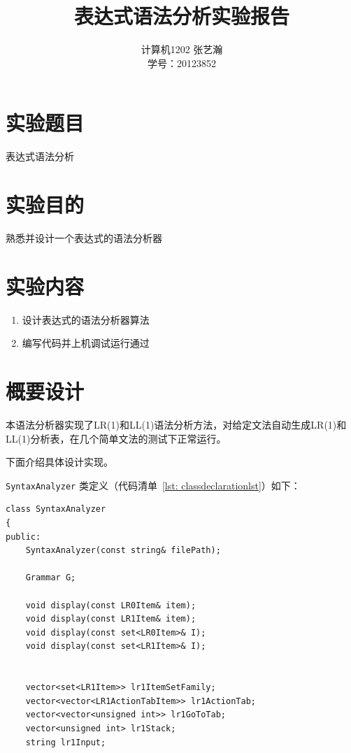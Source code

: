 \documentclass{article}
\begin{document}
\begin{CJK*}{UTF8}{gbsn}
\CJKtilde

\title{表达式语法分析实验报告}

\author{计算机1202 张艺瀚\\学号：20123852}
\maketitle

\section{实验题目}
表达式语法分析

\section{实验目的}
熟悉并设计一个表达式的语法分析器

\section{实验内容}
\begin{enumerate}
\item 设计表达式的语法分析器算法
\item 编写代码并上机调试运行通过
\end{enumerate}

\section{概要设计}

本语法分析器实现了LR(1)和LL(1)语法分析方法，对给定文法自动生成LR(1)和LL(1)分析表，在几个简单文法的测试下正常运行。

下面介绍具体设计实现。

\texttt{SyntaxAnalyzer} 类定义（代码清单~\ref{lst: classdeclarationlst}）如下：
\begin{center}
\begin{lstlisting}[caption = {\texttt{SyntaxAnalyzer} 类定义代码清单}, label = {lst: classdeclarationlst}]
class SyntaxAnalyzer
{
public:
	SyntaxAnalyzer(const string& filePath);

	Grammar G;

	void display(const LR0Item& item);
	void display(const LR1Item& item);
	void display(const set<LR0Item>& I);
	void display(const set<LR1Item>& I);
	
	
	vector<set<LR1Item>> lr1ItemSetFamily;
	vector<vector<LR1ActionTabItem>> lr1ActionTab;
	vector<vector<unsigned int>> lr1GoToTab;
	vector<unsigned int> lr1Stack;
	string lr1Input;


\end{lstlisting}
\end{center}
\end{CJK*}
\end{document}
